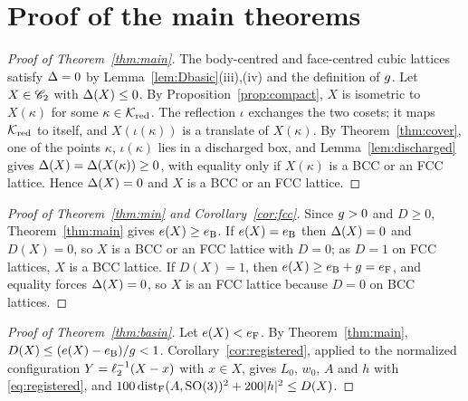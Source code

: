 \section{Proof of the main theorems}\label{sec:proof}

\begin{proof}[Proof of Theorem~\ref{thm:main}]
The body-centred and face-centred cubic lattices satisfy $\Delta=0$ by Lemma~\ref{lem:Dbasic}(iii),(iv) and the definition of $g$.
Let $X\in\mathscr C_2$ with $\Delta(X)\le0$. By Proposition~\ref{prop:compact}, $X$ is isometric to $X(\kappa)$ for some
$\kappa\in\mathcal K_{\mathrm{red}}$. The reflection $\iota$ exchanges the two cosets; it maps $\mathcal K_{\mathrm{red}}$ to itself, and
$X(\iota(\kappa))$ is a translate of $X(\kappa)$. By Theorem~\ref{thm:cover}, one of the points $\kappa$, $\iota(\kappa)$ lies in a
discharged box, and Lemma~\ref{lem:discharged} gives $\Delta(X)=\Delta(X(\kappa))\ge0$, with equality only if $X(\kappa)$ is a BCC or an
FCC lattice. Hence $\Delta(X)=0$ and $X$ is a BCC or an FCC lattice.
\end{proof}

\begin{proof}[Proof of Theorem~\ref{thm:min} and Corollary~\ref{cor:fcc}]
Since $g>0$ and $D\ge0$, Theorem~\ref{thm:main} gives $e(X)\ge e_{\mathrm B}$. If $e(X)=e_{\mathrm B}$ then $\Delta(X)=0$ and $D(X)=0$, so $X$ is a BCC or
an FCC lattice with $D=0$; as $D=1$ on FCC lattices, $X$ is a BCC lattice. If $D(X)=1$, then $e(X)\ge e_{\mathrm B}+g=e_{\mathrm F}$, and equality forces
$\Delta(X)=0$, so $X$ is an FCC lattice because $D=0$ on BCC lattices.
\end{proof}

\begin{proof}[Proof of Theorem~\ref{thm:basin}]
Let $e(X)<e_{\mathrm F}$. By Theorem~\ref{thm:main}, $D(X)\le(e(X)-e_{\mathrm B})/g<1$. Corollary~\ref{cor:registered}, applied to the normalized
configuration $Y=\ell_2^{-1}(X-x)$ with $x\in X$, gives $L_0$, $w_0$, $A$ and $h$ with \eqref{eq:registered}, and
$100\operatorname{dist}_\mathrm F(A,\mathrm{SO}(3))^2+200|h|^2\le D(X)$.
\end{proof}
